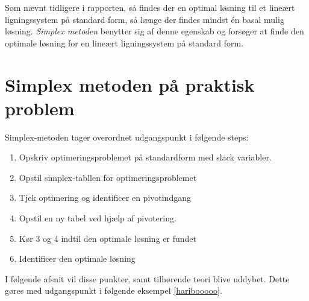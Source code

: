 Som nævnt tidligere i rapporten, så findes der en optimal løsning til et lineært ligningssystem på standard form, så længe der findes mindst én basal mulig løsning. 
\textit{Simplex metoden} benytter sig af denne egenskab og forsøger at finde den optimale løsning for en lineært ligningssystem på standard form.
%
%
\section{Simplex metoden på praktisk problem}
Simplex-metoden tager overordnet udgangspunkt i følgende steps: 
%
\begin{col}{}{}
%
\begin{enumerate}
\item Opskriv optimeringsproblemet på standardform med slack variabler.  %
\item Opstil simplex-tabllen for optimeringsproblemet					 %
\item Tjek optimering og identificer en pivotindgang					 %
\item Opstil en ny tabel ved hjælp af pivotering. 						 %
\item Kør 3 og 4 indtil den optimale løsning er fundet 					 %
\item Identificer den optimale løsning									 %
\end{enumerate}
%
\end{col}
\noindent
%
I følgende afsnit vil disse punkter, samt tilhørende teori blive uddybet. 
Dette gøres med udgangspunkt i følgende eksempel \ref{haribooooo}.
%
\\
%
